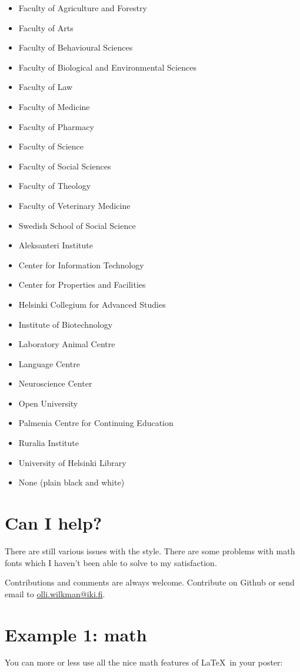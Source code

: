 \documentclass[final]{beamer}
\begin{document}
\begin{poster}
\begin{itemize}
\item Faculty of Agriculture and Forestry 
\item Faculty of Arts 
\item Faculty of Behavioural Sciences 
\item Faculty of Biological and Environmental Sciences 
\item Faculty of Law 
\item Faculty of Medicine 
\item Faculty of Pharmacy 
\item Faculty of Science 
\item Faculty of Social Sciences 
\item Faculty of Theology 
\item Faculty of Veterinary Medicine 
\item Swedish School of Social Science
\item Aleksanteri Institute
\item Center for Information Technology
\item Center for Properties and Facilities
\item Helsinki Collegium for Advanced Studies
\item Institute of Biotechnology
\item Laboratory Animal Centre
\item Language Centre
\item Neuroscience Center
\item Open University
\item Palmenia Centre for Continuing Education
\item Ruralia Institute
\item University of Helsinki Library
\item None (plain black and white)
\end{itemize}


\section{Can I help?}
There are still various issues with the style. There are some problems with math fonts which I haven't been able to solve to my satisfaction.

Contributions and comments are always welcome. Contribute on Github or send email to \url{olli.wilkman@iki.fi}.


\newcolumn

\section{Example 1: math}
You can more or less use all the nice math features of \LaTeX~in your poster:


\end{poster}
\end{document}
